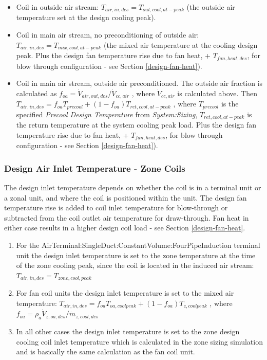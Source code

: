 \begin{itemize}
\item
  Coil in outside air stream: \(T_{air,in,des} = T_{out,cool,at-peak}\) (the outside air temperature set at the design cooling peak).
\item
  Coil in main air stream, no preconditioning of outside air: \(T_{air,in,des} = T_{mix,cool,at-peak}\) (the mixed air temperature at the cooling design peak. Plus the design fan temperature rise due to fan heat, + \(T_{fan,heat,des}\), for blow through configuration - see Section \ref{design-fan-heat}).
\item
  Coil in main air stream, outside air preconditioned. The outside air fraction is calculated as \(f_{oa} = \dot V_{air,out,des}/\dot V_{cc,air}\) , where \(\dot V_{cc,air}\) is calculated above. Then \(T_{air,in,des} = f_{oa}T_{precool}+\left(1-f_{oa}\right)T_{ret,cool,at-peak}\) , where \(T_{precool}\) is the specified \emph{Precool Design Temperature} from \emph{System:Sizing}, \(T_{ret,cool,at-peak}\) is the return temperature at the system cooling peak load. Plus the design fan temperature rise due to fan heat, + \(T_{fan,heat,des}\), for blow through configuration - see Section \ref{design-fan-heat}).
\end{itemize}

\subsubsection{Design Air Inlet Temperature - Zone Coils}\label{design-air-inlet-temperature---zone-coils}

The design inlet temperature depends on whether the coil is in a terminal unit or a zonal unit, and where the coil is positioned within the unit. The design fan temperature rise is added to coil inlet temperature for blow-through or subtracted from the coil outlet air temperature for draw-through. Fan heat in either case results in a higher design coil load - see Section \ref{design-fan-heat}.

\begin{enumerate}
\def\labelenumi{\arabic{enumi}.}
\item
  For the AirTerminal:SingleDuct:ConstantVolume:FourPipeInduction terminal unit the design inlet temperature is set to the zone temperature at the time of the zone cooling peak, since the coil is located in the induced air stream: \(T_{air,in,des} = T_{zone,cool,peak}\)
\item
  For fan coil units the design inlet temperature is set to the mixed air temperature: \(T_{air,in,des} = f_{oa}T_{oa,coolpeak} + \left(1-f_{oa}\right)T_{z,coolpeak}\) , where \(f_{oa} = \rho_a \dot V_{z,oa,des} / \dot m_{z,cool,des}\)
\item
  In all other cases the design inlet temperature is set to the zone design cooling coil inlet temperature which is calculated in the zone sizing simulation and is basically the same calculation as the fan coil unit.
\end{enumerate}

